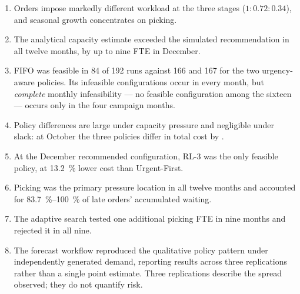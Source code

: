 \begin{enumerate}
  \item Orders impose markedly different workload at the three stages
        (\(1 : 0.72 : 0.34\)), and seasonal growth concentrates on picking.
  \item The analytical capacity estimate exceeded the simulated recommendation in all twelve
        months, by up to nine FTE in December.
  \item FIFO was feasible in \num{84} of \num{192} runs against \num{166} and \num{167} for the
        two urgency-aware policies. Its infeasible configurations occur in every month, but
        \emph{complete} monthly infeasibility --- no feasible configuration among the sixteen
        --- occurs only in the four campaign months.
  \item Policy differences are large under capacity pressure and negligible under slack: at
        October  the three policies differ in total cost by .
  \item At the December recommended configuration, RL-3 was the only feasible policy, at
        \SI{13.2}{\percent} lower cost than Urgent-First.
  \item Picking was the primary pressure location in all twelve months and accounted for
        \SIrange{83.7}{100}{\percent} of late orders' accumulated waiting.
  \item The adaptive search tested one additional picking FTE in nine months and rejected it in
        all nine.
  \item The forecast workflow reproduced the qualitative policy pattern under independently
        generated demand, reporting results across three replications rather than a single
        point estimate. Three replications describe the spread observed; they do not quantify
        risk.
\end{enumerate}
